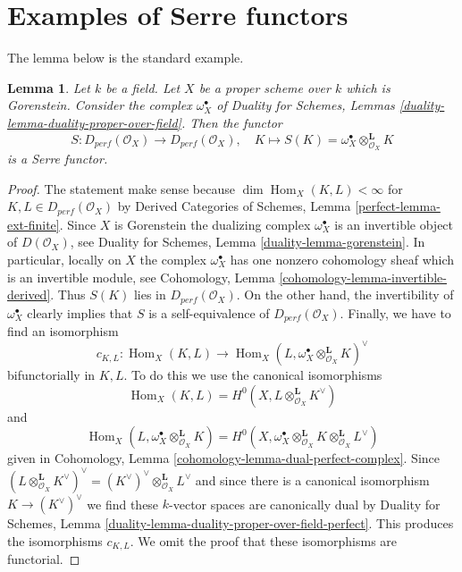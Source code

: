 \documentclass{stacks-project}
\theoremstyle{plain}
\newtheorem{lemma}[subsection]{Lemma}
\theoremstyle{definition}
\theoremstyle{remark}
\numberwithin{equation}{subsection}
\def\Hom{\mathop{\mathrm{Hom}}\nolimits}
\begin{document}
\section{Examples of Serre functors}
\label{section-examples-Serre-functors}

\noindent
The lemma below is the standard example.

\begin{lemma}
\label{lemma-Serre-functor-Gorenstein-proper}
Let $k$ be a field. Let $X$ be a proper scheme over $k$ which is Gorenstein.
Consider the complex $\omega_X^\bullet$ of
Duality for Schemes, Lemmas \ref{duality-lemma-duality-proper-over-field}.
Then the functor
$$
S : D_{perf}(\mathcal{O}_X) \longrightarrow D_{perf}(\mathcal{O}_X),\quad
K \longmapsto S(K) = \omega_X^\bullet \otimes_{\mathcal{O}_X}^\mathbf{L} K
$$
is a Serre functor.
\end{lemma}

\begin{proof}
The statement make sense because $\dim \Hom_X(K, L) < \infty$
for $K, L \in D_{perf}(\mathcal{O}_X)$ by
Derived Categories of Schemes, Lemma \ref{perfect-lemma-ext-finite}.
Since $X$ is Gorenstein the dualizing complex $\omega_X^\bullet$
is an invertible object of $D(\mathcal{O}_X)$, see
Duality for Schemes, Lemma \ref{duality-lemma-gorenstein}.
In particular, locally on $X$ the complex $\omega_X^\bullet$
has one nonzero cohomology sheaf which is an invertible module, see
Cohomology, Lemma \ref{cohomology-lemma-invertible-derived}.
Thus $S(K)$ lies in $D_{perf}(\mathcal{O}_X)$.
On the other hand, the invertibility of $\omega_X^\bullet$
clearly implies that $S$ is a self-equivalence of $D_{perf}(\mathcal{O}_X)$.
Finally, we have to find an isomorphism
$$
c_{K, L} : \Hom_X(K, L) \longrightarrow
\Hom_X(L, \omega_X^\bullet \otimes_{\mathcal{O}_X}^\mathbf{L} K)^\vee
$$
bifunctorially in $K, L$. To do this we use the canonical isomorphisms
$$
\Hom_X(K, L) = H^0(X, L \otimes_{\mathcal{O}_X}^\mathbf{L} K^\vee)
$$
and
$$
\Hom_X(L, \omega_X^\bullet \otimes_{\mathcal{O}_X}^\mathbf{L} K) =
H^0(X, 
\omega_X^\bullet \otimes_{\mathcal{O}_X}^\mathbf{L} K
\otimes_{\mathcal{O}_X}^\mathbf{L} L^\vee)
$$
given in Cohomology, Lemma \ref{cohomology-lemma-dual-perfect-complex}.
Since $(L \otimes_{\mathcal{O}_X}^\mathbf{L} K^\vee)^\vee =
(K^\vee)^\vee \otimes_{\mathcal{O}_X}^\mathbf{L} L^\vee$
and since there is a canonical isomorphism $K \to (K^\vee)^\vee$
we find these $k$-vector spaces are canonically dual by
Duality for Schemes, Lemma
\ref{duality-lemma-duality-proper-over-field-perfect}.
This produces the isomorphisms $c_{K, L}$.
We omit the proof that these isomorphisms are functorial.
\end{proof}
\end{document}
